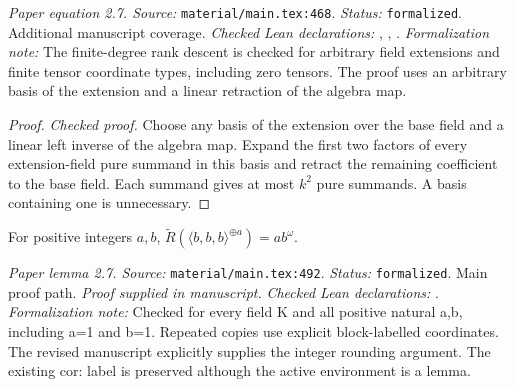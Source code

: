 \noindent\textit{Paper equation 2.7. Source:} \texttt{material/main.tex:468}.
\textit{Status:} \texttt{formalized}. Additional manuscript coverage.
\textit{Checked Lean declarations:} , , .
\textit{Formalization note:} The finite-degree rank descent is checked for arbitrary field extensions and finite tensor coordinate types, including zero tensors. The proof uses an arbitrary basis of the extension and a linear retraction of the algebra map.

\begin{proof}
\leanok
{}
\textit{Checked proof.} Choose any basis of the extension over the base field and a linear left inverse of the algebra map. Expand the first two factors of every extension-field pure summand in this basis and retract the remaining coefficient to the base field. Each summand gives at most $k^2$ pure summands. A basis containing one is unnecessary.
\end{proof}

\renewcommand{\thetheorem}{2.7}
\begin{lemma}
\label{cor:asymptotic-rank-lower-bound}
\manuscriptproof
{}
\leanok
{}
For positive integers $a,b$, $\widetilde R(\langle b,b,b\rangle^{\oplus a})=ab^\omega$.
\end{lemma}

\noindent\textit{Paper lemma 2.7. Source:} \texttt{material/main.tex:492}.
\textit{Status:} \texttt{formalized}. Main proof path.
\textit{Proof supplied in manuscript.}
\textit{Checked Lean declarations:} .
\textit{Formalization note:} Checked for every field K and all positive natural a,b, including a=1 and b=1. Repeated copies use explicit block-labelled coordinates. The revised manuscript explicitly supplies the integer rounding argument. The existing cor: label is preserved although the active environment is a lemma.

